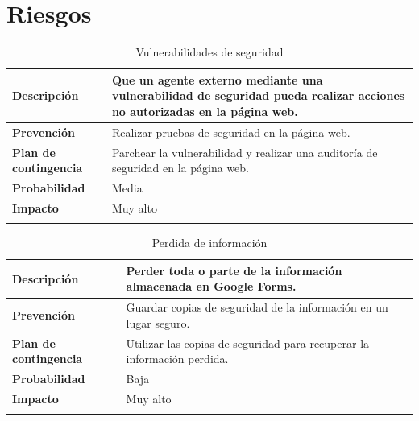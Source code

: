 \documentclass{report}
\begin{document}
    \chapter{Riesgos}
        \begin{center}
            \begin{longtable}{|p{6cm}|p{6cm}|}
                \hline
                \textbf{Descripción} & Que un agente externo mediante una vulnerabilidad de seguridad pueda realizar acciones no autorizadas en la página web.\\
                \hline
                \textbf{Prevención} & Realizar pruebas de seguridad en la página web.\\
                \hline
                \textbf{Plan de contingencia} & Parchear la vulnerabilidad y realizar una auditoría de seguridad en la página web.\\
                \hline
                \textbf{Probabilidad} & Media\\
                \hline
                \textbf{Impacto} & Muy alto\\
                \hline
                \caption{Vulnerabilidades de seguridad}
            \end{longtable}
        \end{center}
        \begin{center}
            \begin{longtable}{|p{6cm}|p{6cm}|}
                \hline
                \textbf{Descripción} & Perder toda o parte de la información almacenada en Google Forms.\\
                \hline
                \textbf{Prevención} & Guardar copias de seguridad de la información en un lugar seguro.\\
                \hline
                \textbf{Plan de contingencia} & Utilizar las copias de seguridad para recuperar la información perdida.\\
                \hline
                \textbf{Probabilidad} & Baja\\
                \hline
                \textbf{Impacto} & Muy alto\\
                \hline
                \caption{Perdida de información}
            \end{longtable}
        \end{center}
\end{document}
